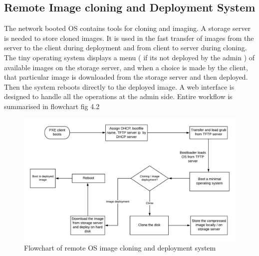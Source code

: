 \documentclass[a4paper,12pt]{article}
\begin{document}
\subsection{ Remote Image cloning and Deployment System}
  The network booted OS contains tools for cloning and imaging. A storage server is needed to store cloned images. It is used in the fast transfer of images from the server to the client during deployment and from client to server during cloning.
  The tiny operating system displays a menu ( if its not deployed by the admin ) of available images on the storage server, and when a choice is made by the client, that particular image is downloaded from the storage server and then deployed. Then the system reboots directly to the deployed image. A web interface is designed to handle all the operations at the admin side.
  Entire workflow is summarised in flowchart fig 4.2
\newline
\begin{figure}[h!]
    \centering
    \includegraphics[width=\linewidth]{Workflow.png}
    \caption{Flowchart of remote OS image cloning and deployment system}
    \label{fig:Use case}
\end{figure}
\end{document}

